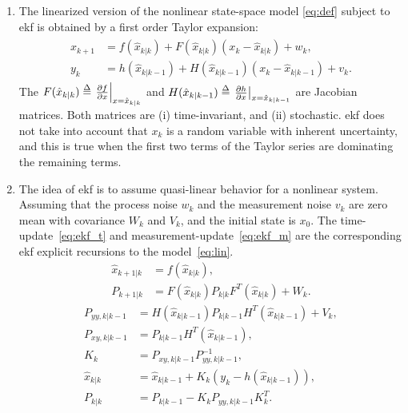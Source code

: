 \documentclass[12pt]{article}
\def\delequal{\mathrel{\ensurestackMath{\stackon[1pt]{=}{\scriptstyle\Delta}}}}
\newcommand\at[2]{\left.#1\right|_{#2}}
\begin{document}
\begin{enumerate}[label=\arabic*)]

    \item 
        The linearized version of the nonlinear state-space model \eqref{eq:def} subject to \acrshort{ekf} is obtained by a first order Taylor expansion:
        \begin{align} \label{eq:lin}
            \begin{split}
                x_{k+1} &= f(\hat x_{k|k}) + F(\hat x_{k|k}) (x_k - \hat x_{k|k}) + w_k, \\
                y_k &= h(\hat x_{k|k-1}) + H(\hat x_{k|k-1}) (x_k - \hat x_{k|k-1}) + v_k.
            \end{split}
        \end{align}
        The $F(\hat x_{k|k})\delequal\at{\frac{\partial f}{\partial x}}{x=\hat x_{k|k}}$ and $H(\hat x_{k|k-1}) \delequal \at{\frac{\partial h}{\partial x}}{x=\hat x_{k|k-1}}$ are Jacobian matrices. Both matrices are (i) time-invariant, and (ii) stochastic. \acrshort{ekf} does not take into account that $x_k$ is a random variable with inherent uncertainty, and this is true when the first two terms of the Taylor series are dominating the remaining terms. 
        
    \item
        The idea of \acrshort{ekf} is to assume quasi-linear behavior for a nonlinear system. Assuming that the process noise $w_k$ and the measurement noise $v_k$ are zero mean with covariance $W_k$ and $V_k$, and the initial state is $x_0$. The time-update~\eqref{eq:ekf_t} and measurement-update~\eqref{eq:ekf_m} are the corresponding \acrshort{ekf} explicit recursions \cite{gustafsson2010particle, sarkka2013bayesian} to the model~\eqref{eq:lin}.
        \begin{subequations}  \label{eq:ekf_t}
        \begin{align} 
            \hat x_{k+1|k} &= f(\hat x_{k|k}), 
            \label{eq:ekf_t1} \\
            P_{k+1|k} &= F(\hat x_{k|k}) P_{k|k} F^T(\hat x_{k|k}) + W_k.
            \label{eq:ekf_t2} 
        \end{align} 
        \end{subequations}
        \begin{subequations}    \label{eq:ekf_m}
        \begin{align}
            P_{yy, k|k-1} &= H(\hat x_{k|k-1}) P_{k|k-1} H^T(\hat x_{k|k-1}) + V_k, \label{eq:ekf_m1}\\
            P_{xy, k|k-1} &= P_{k|k-1} H^T(\hat x_{k|k-1}), \label{eq:ekf_m2}\\
            K_k &= P_{xy,k|k-1} P^{-1}_{yy,k|k-1}, \label{eq:ekf_m3} \\
            \hat x_{k|k} &= \hat x_{k|k-1} + K_k (y_k - h(\hat{x}_{k|k-1})), \label{eq:ekf_m4}\\
            P_{k|k} &= P_{k|k-1} - K_k P_{yy,k|k-1} K_k^T. \label{eq:ekf_m5} 
        \end{align}
        \end{subequations}
        

\end{enumerate}
\end{document}
